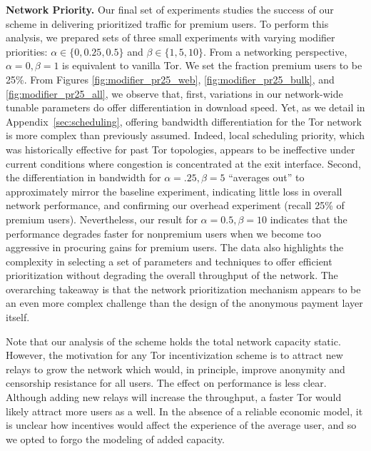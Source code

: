 \medskip \noindent \textbf{Network Priority.}
\label{sec:priority_exp} Our final set of experiments studies the success of our scheme in delivering prioritized traffic for premium users.
To perform this analysis, we prepared sets of three small experiments with varying modifier priorities: $\alpha \in \{0, 0.25, 0.5\}$ and $\beta \in \{1, 5, 10\}$.
From a networking perspective, $\alpha = 0, \beta = 1$ is equivalent to vanilla Tor.
We set the fraction premium users to be 25\%.
From Figures \ref{fig:modifier_pr25_web}, \ref{fig:modifier_pr25_bulk}, and \ref{fig:modifier_pr25_all}, we observe that, first, variations in our network-wide tunable parameters do offer differentiation in download speed.
Yet, as we detail in Appendix~\ref{sec:scheduling}, offering bandwidth differentiation for the Tor network is more complex than previously assumed.
Indeed, local scheduling priority, which was historically effective for past Tor topologies, appears to be ineffective under current conditions where congestion is concentrated at the exit interface.
Second, the differentiation in bandwidth for $\alpha = .25, \beta=5$ ``averages out'' to approximately mirror the baseline experiment, indicating little loss in overall network performance, and confirming our overhead experiment (recall 25\% of premium users).
Nevertheless, our result for $\alpha = 0.5, \beta=10$ indicates that the performance degrades faster for nonpremium users when we become too aggressive in procuring gains for premium users.
The data also highlights the complexity in selecting a set of parameters and techniques to offer efficient prioritization without degrading the overall throughput of the network.
The overarching takeaway is that the network prioritization mechanism appears to be an even more complex challenge than the design of the anonymous payment layer itself.

Note that our analysis of the scheme holds the total network capacity static.
However, the motivation for any Tor incentivization scheme is to attract new relays to grow the network which would, in principle, improve anonymity and censorship resistance for all users.
The effect on performance is less clear.
Although adding new relays will increase the throughput, a faster Tor would likely attract more users as a well.
In the absence of a reliable economic model, it is unclear how incentives would affect the experience of the average user, and so we opted to forgo the modeling of added capacity.


